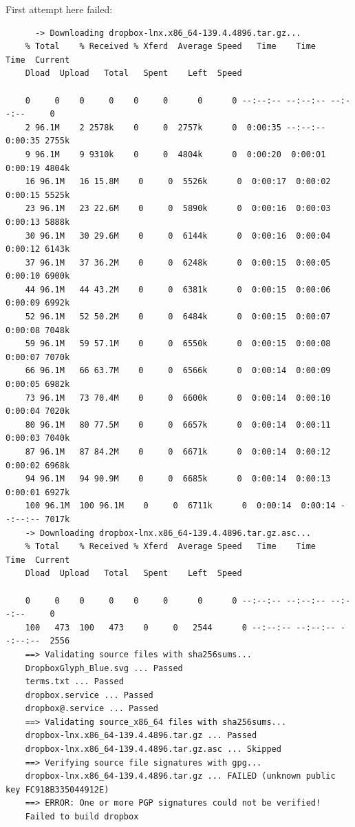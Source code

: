 \documentclass[]{scrartcl}
\begin{document}
First attempt here failed:
\begin{small}
\begin{verbatim}
	  -> Downloading dropbox-lnx.x86_64-139.4.4896.tar.gz...
	% Total    % Received % Xferd  Average Speed   Time    Time     Time  Current
	Dload  Upload   Total   Spent    Left  Speed
	
	0     0    0     0    0     0      0      0 --:--:-- --:--:-- --:--:--     0
	2 96.1M    2 2578k    0     0  2757k      0  0:00:35 --:--:--  0:00:35 2755k
	9 96.1M    9 9310k    0     0  4804k      0  0:00:20  0:00:01  0:00:19 4804k
	16 96.1M   16 15.8M    0     0  5526k      0  0:00:17  0:00:02  0:00:15 5525k
	23 96.1M   23 22.6M    0     0  5890k      0  0:00:16  0:00:03  0:00:13 5888k
	30 96.1M   30 29.6M    0     0  6144k      0  0:00:16  0:00:04  0:00:12 6143k
	37 96.1M   37 36.2M    0     0  6248k      0  0:00:15  0:00:05  0:00:10 6900k
	44 96.1M   44 43.2M    0     0  6381k      0  0:00:15  0:00:06  0:00:09 6992k
	52 96.1M   52 50.2M    0     0  6484k      0  0:00:15  0:00:07  0:00:08 7048k
	59 96.1M   59 57.1M    0     0  6550k      0  0:00:15  0:00:08  0:00:07 7070k
	66 96.1M   66 63.7M    0     0  6566k      0  0:00:14  0:00:09  0:00:05 6982k
	73 96.1M   73 70.4M    0     0  6600k      0  0:00:14  0:00:10  0:00:04 7020k
	80 96.1M   80 77.5M    0     0  6657k      0  0:00:14  0:00:11  0:00:03 7040k
	87 96.1M   87 84.2M    0     0  6671k      0  0:00:14  0:00:12  0:00:02 6968k
	94 96.1M   94 90.9M    0     0  6685k      0  0:00:14  0:00:13  0:00:01 6927k
	100 96.1M  100 96.1M    0     0  6711k      0  0:00:14  0:00:14 --:--:-- 7017k
	-> Downloading dropbox-lnx.x86_64-139.4.4896.tar.gz.asc...
	% Total    % Received % Xferd  Average Speed   Time    Time     Time  Current
	Dload  Upload   Total   Spent    Left  Speed
	
	0     0    0     0    0     0      0      0 --:--:-- --:--:-- --:--:--     0
	100   473  100   473    0     0   2544      0 --:--:-- --:--:-- --:--:--  2556
	==> Validating source files with sha256sums...
	DropboxGlyph_Blue.svg ... Passed
	terms.txt ... Passed
	dropbox.service ... Passed
	dropbox@.service ... Passed
	==> Validating source_x86_64 files with sha256sums...
	dropbox-lnx.x86_64-139.4.4896.tar.gz ... Passed
	dropbox-lnx.x86_64-139.4.4896.tar.gz.asc ... Skipped
	==> Verifying source file signatures with gpg...
	dropbox-lnx.x86_64-139.4.4896.tar.gz ... FAILED (unknown public key FC918B335044912E)
	==> ERROR: One or more PGP signatures could not be verified!
	Failed to build dropbox
\end{verbatim}
\end{small}
\end{document}
